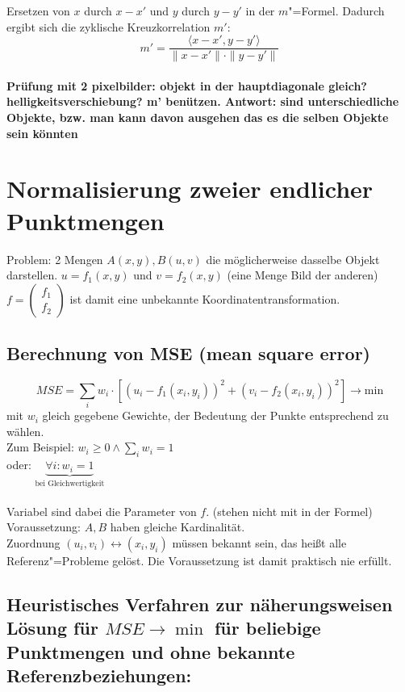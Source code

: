 \documentclass[a4paper,12pt]{scrreprt}
\begin{document}
Ersetzen von $x$ durch $x-x'$ und $y$ durch $y-y'$ in der $m$"=Formel. 
Dadurch ergibt sich die zyklische Kreuzkorrelation $m'$:
$$ m'=\frac{\langle x-x', y-y'\rangle}{\|x-x'\|\cdot\|y-y'\|}$$
\paragraph{Prüfung mit 2 pixelbilder: objekt in der hauptdiagonale gleich?
helligkeitsverschiebung? m' benützen. Antwort: sind unterschiedliche
Objekte, bzw. man kann davon ausgehen das es die selben Objekte sein
könnten}

\section{Normalisierung zweier endlicher Punktmengen} Problem: 2
Mengen $A(x,y), B(u,v)$ die möglicherweise dasselbe Objekt darstellen.
$u=f_1(x,y)$ und $v=f_2(x,y)$ (eine Menge Bild der anderen)\\
$f=\begin{pmatrix}f_1\\f_2\end{pmatrix}$ ist damit eine unbekannte
Koordinatentransformation.
\subsection{Berechnung von MSE (mean square error)}
$$MSE=\sum\limits_iw_i\cdot\left[\left( u_i-f_1(x_i,y_i) \right)^2 +
\left( v_i-f_2(x_i,y_i) \right)^2 \right] \rightarrow \text{min} $$ 
mit $w_i$ gleich gegebene Gewichte, der Bedeutung der Punkte
entsprechend zu wählen.\\
Zum Beispiel: $w_i\ge0 \land \sum\limits_iw_i=1$\\
oder: $\underbrace{\forall i: w_i=1}_{\text{bei Gleichwertigkeit}}$\\
\\
Variabel sind dabei die Parameter von $f$. (stehen nicht mit in der Formel)\\
Voraussetzung: $A, B$ haben gleiche Kardinalität.\\
Zuordnung $(u_i, v_i)\leftrightarrow(x_i,y_i)$ müssen bekannt sein,
das heißt alle Referenz"=Probleme gelöst. Die Voraussetzung ist damit
praktisch nie erfüllt.
  
\subsection{Heuristisches Verfahren zur näherungsweisen Lösung für
$MSE\to\min$ für beliebige Punktmengen und ohne bekannte
Referenzbeziehungen:} 
\end{document}

